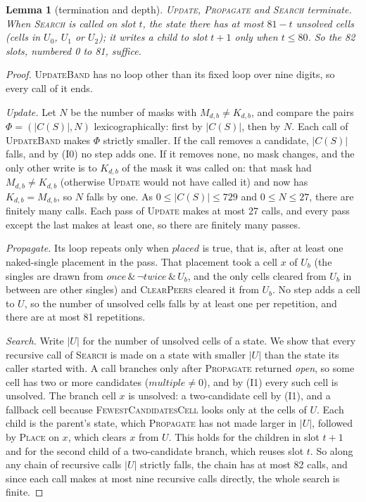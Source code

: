 \documentclass[11pt]{article}
\newtheorem{lemma}[theorem]{Lemma}
\theoremstyle{definition}
\theoremstyle{plain}
\let\origtextsc\textsc
\renewcommand{\textsc}[1]{\textup{\origtextsc{#1}}}
\begin{document}
\begin{lemma}[termination and depth]
\label{lem:termination}
\textsc{Update}, \textsc{Propagate} and \textsc{Search} terminate. When \textsc{Search} is called on slot $t$, the
state there has at most $81-t$ unsolved cells (cells in $U_0$, $U_1$ or $U_2$); it writes a child to slot $t+1$ only
when $t\le 80$. So the 82 slots, numbered 0 to 81, suffice.
\end{lemma}
\begin{proof}
\textsc{UpdateBand} has no loop other than its fixed loop over nine digits, so every call of it ends.

\emph{Update.} Let $N$ be the number of masks with $M_{d,b}\neq K_{d,b}$, and compare the pairs $\Phi=(|C(S)|, N)$
lexicographically: first by $|C(S)|$, then by $N$. Each call of \textsc{UpdateBand} makes $\Phi$ strictly smaller. If
the call removes a candidate, $|C(S)|$ falls, and by (I0) no step adds one. If it removes none, no mask changes, and
the only other write is to $K_{d,b}$ of the mask it was called on: that mask had $M_{d,b}\neq K_{d,b}$ (otherwise
\textsc{Update} would not have called it) and now has $K_{d,b}=M_{d,b}$, so $N$ falls by one. As $0\le|C(S)|\le 729$ and
$0\le N\le 27$, there are finitely many calls. Each pass of \textsc{Update} makes at most 27 calls, and every pass
except the last makes at least one, so there are finitely many passes.

\emph{Propagate.} Its loop repeats only when $\mathit{placed}$ is true, that is, after at least one naked-single
placement in the pass. That placement took a cell $x$ of $U_b$ (the singles are drawn from
$\mathit{once}\,\&\,\lnot\mathit{twice}\,\&\,U_b$, and the only cells cleared from $U_b$ in between are other singles)
and \textsc{ClearPeers} cleared it from $U_b$. No step adds a cell to $U$, so the number of unsolved cells falls by at
least one per repetition, and there are at most 81 repetitions.

\emph{Search.} Write $|U|$ for the number of unsolved cells of a state. We show that every recursive call of
\textsc{Search} is made on a state with smaller $|U|$ than the state its caller started with. A call branches only
after \textsc{Propagate} returned \emph{open}, so some cell has two or more candidates ($\mathit{multiple}\neq 0$), and
by (I1) every such cell is unsolved. The branch cell $x$ is unsolved: a two-candidate cell by (I1), and a fallback cell
because \textsc{FewestCandidatesCell} looks only at the cells of $U$. Each child is the parent's state, which
\textsc{Propagate} has not made larger in $|U|$, followed by \textsc{Place} on $x$, which clears $x$ from $U$. This
holds for the children in slot $t+1$ and for the second child of a two-candidate branch, which reuses slot $t$. So
along any chain of recursive calls $|U|$ strictly falls, the chain has at most 82 calls, and since each call makes at
most nine recursive calls directly, the whole search is finite.


\end{proof}
\end{document}
